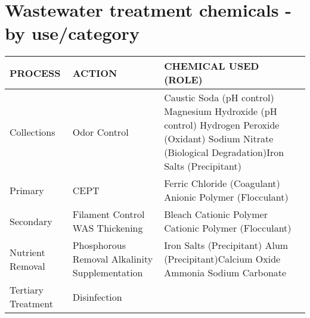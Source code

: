 \newpage
\section{Wastewater treatment chemicals - by use/category}
\begin{tabular}{ |p{4cm}|p{4.5cm}|p{6.5cm}|  }
\hline

\hspace{1 cm}PROCESS & \hspace{1.2 cm} ACTION & \hspace{1.2 cm} CHEMICAL USED (ROLE) \\
\hline
Collections & Odor Control & Caustic Soda (pH control) \newline Magnesium Hydroxide (pH control) \newline Hydrogen Peroxide (Oxidant) \newline Sodium Nitrate (Biological Degradation)\newline Iron Salts (Precipitant)\\
\hline
Primary & CEPT & Ferric Chloride (Coagulant) \newline Anionic Polymer (Flocculant) \\
\hline
Secondary    &Filament Control \newline \textsf{} \newline WAS Thickening & Bleach \newline Cationic Polymer \newline Cationic Polymer (Flocculant)\\
\hline
Nutrient Removal & Phosphorous Removal \newline \textsl{} \newline
Alkalinity Supplementation & Iron Salts (Precipitant) \newline Alum (Precipitant)\newline Calcium Oxide \newline Ammonia \newline Sodium Carbonate \\
\hline
Tertiary Treatment & Disinfection  \newline 

\end{tabular}
